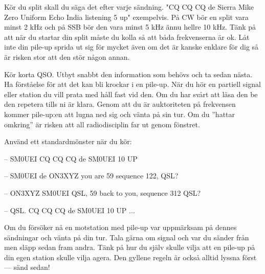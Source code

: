 Kör du split skall du säga det efter varje sändning. "CQ CQ CQ de Sierra Mike Zero Uniform Echo India listening 5 up" exempelvis. På CW bör en split vara minst 2 kHz och på SSB bör den vara minst 5 kHz ännu hellre 10 kHz. Tänk på att när du startar din split måste du kolla så att båda frekvenserna är ok. Låt inte din pile-up sprida ut sig för mycket även om det är kanske enklare för dig så är risken stor att den stör någon annan. 

Kör korta QSO. Utbyt snabbt den information som behövs och ta sedan nästa. Ha förståelse för att det kan bli krockar i en pile-up. När du hör en partiell signal eller station du vill prata med håll fast vid den. Om du har svårt att läsa den be den repetera tills ni är klara. Genom att du är auktoriteten på frekvensen kommer pile-up:en att lugna ned sig och vänta på sin tur. Om du ''hattar omkring'' är risken att all radiodisciplin far ut genom fönstret.

Använd ett standardmönster när du kör:

-- SM0UEI CQ CQ CQ de SM0UEI 10 UP

-- SM0UEI de ON3XYZ you are 59 sequence 122, QSL?

-- ON3XYZ SM0UEI QSL, 59 back to you, sequence 312 QSL?

-- QSL. CQ CQ CQ de SM0UEI 10 UP ...

Om du försöker nå en motstation med pile-up var uppmärksam på dennes sändningar och vänta på din tur. Tala gärna om signal och var du sänder från men släpp sedan fram andra. Tänk på hur du själv skulle vilja att en pile-up på din egen station skulle vilja agera. Den gyllene regeln är också alltid lyssna först --- sänd sedan!

